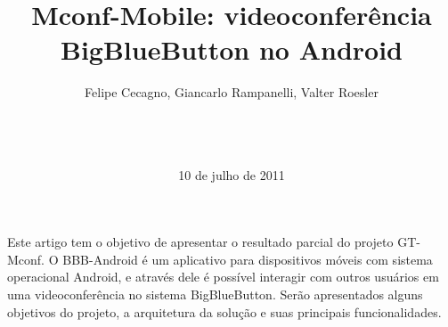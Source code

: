 \documentclass{acm_proc_article-sp}
\begin{document}
\title{Mconf-Mobile: videoconferência \\BigBlueButton no Android}
%
%
%
%
%

%
\author{
%
%
Felipe Cecagno,
Giancarlo Rampanelli, 
Valter Roesler\\
       \\
       \\
       \\
}
\date{10 de julho de 2011}

\maketitle
\begin{resumo}
  Este artigo tem o objetivo de apresentar o resultado parcial do projeto GT-Mconf. O BBB-Android é um aplicativo para dispositivos móveis com sistema operacional Android, e através dele é possível interagir com outros usuários em uma videoconferência no sistema BigBlueButton. Serão apresentados alguns objetivos do projeto, a arquitetura da solução e suas principais funcionalidades.
\end{resumo}
\end{document}
